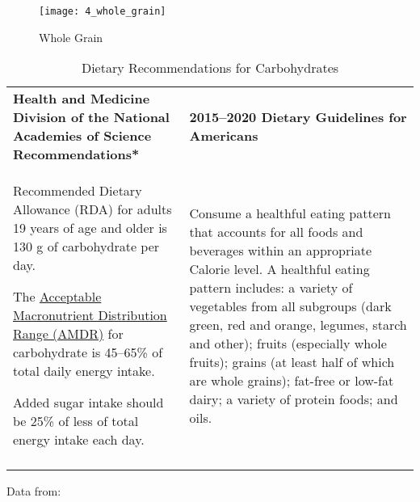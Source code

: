 \documentclass[title={Chapter 4}]{fdsn201notes}
\begin{document}
\begin{figure}[H]
	\centering
	\texttt{[image: 4\_whole\_grain]}
	\caption{Whole Grain}
	\label{fig:whole-grain}
\end{figure}


\begin{table}[H]
    \centering
    \begin{threeparttable}
		\caption{Dietary Recommendations for Carbohydrates}
		\label{tab:dietary-recommendations-for-carbohydrates}
		\begin{tabular}{>{\columncolor{rowlightgreen}}p{} >{\columncolor{rowmedgreen}}p{}}
			\rowcolor{rowdarkgreen}\textbf{Health and Medicine Division of the National Academies of Science Recommendations*} & \textbf{2015--2020 Dietary Guidelines for Americans\textdagger}\\
				Recommended Dietary Allowance (RDA) for adults 19 years of age and older is 130 g of carbohydrate per day.

				The \hyperref[subsec:amdr]{Acceptable Macronutrient Distribution Range (AMDR)} for carbohydrate is 45--65\% of total daily energy intake.

				Added sugar intake should be 25\% of less of total energy intake each day. &
				Consume a healthful eating pattern that accounts for all foods and beverages within an appropriate Calorie level.
				A healthful eating pattern includes: a variety of vegetables from all subgroups (dark green, red and orange, legumes, starch and other); fruits (especially whole fruits); grains (at least half of which are whole grains); fat-free or low-fat dairy; a variety of protein foods; and oils.\\
			\rowcolor{rowdarkgreen} & \\
		\end{tabular}
		\begin{tablenotes}
			\small
			\item *Data from:
		\end{tablenotes}
	\end{threeparttable}
\end{table}
\end{document}

